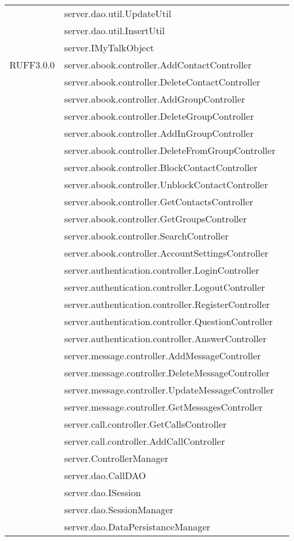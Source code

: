 \begin{center}
\begin{longtable}{lp{}l}
& server.dao.util.UpdateUtil\\
& server.dao.util.InsertUtil\\
& server.IMyTalkObject\\
RUFF3.0.0 & server.abook.controller.AddContactController\\
& server.abook.controller.DeleteContactController\\
& server.abook.controller.AddGroupController\\
& server.abook.controller.DeleteGroupController\\
& server.abook.controller.AddInGroupController\\
& server.abook.controller.DeleteFromGroupController\\
& server.abook.controller.BlockContactController\\
& server.abook.controller.UnblockContactController\\
& server.abook.controller.GetContactsController\\
& server.abook.controller.GetGroupsController\\
& server.abook.controller.SearchController\\
& server.abook.controller.AccountSettingsController\\
& server.authentication.controller.LoginController\\
& server.authentication.controller.LogoutController\\
& server.authentication.controller.RegisterController\\
& server.authentication.controller.QuestionController\\
& server.authentication.controller.AnswerController\\
& server.message.controller.AddMessageController\\
& server.message.controller.DeleteMessageController\\
& server.message.controller.UpdateMessageController\\
& server.message.controller.GetMessagesController\\
& server.call.controller.GetCallsController\\
& server.call.controller.AddCallController\\
& server.ControllerManager\\
 & server.dao.CallDAO\\
& server.dao.ISession\\
& server.dao.SessionManager\\
& server.dao.DataPersistanceManager\\

\end{longtable}
\end{center}
